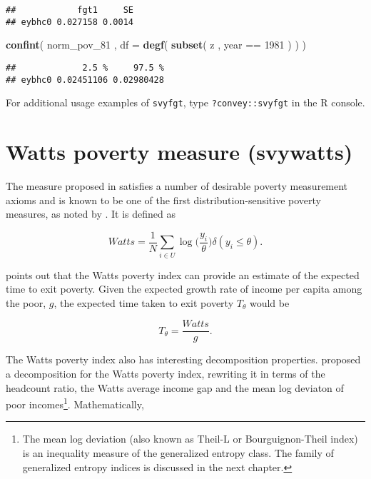 \documentclass[]{book}
\newenvironment{Shaded}{\begin{snugshade}}{\end{snugshade}}
\newcommand{\KeywordTok}[1]{\textcolor[rgb]{0.13,0.29,0.53}{\textbf{{#1}}}}
\newcommand{\DataTypeTok}[1]{\textcolor[rgb]{0.13,0.29,0.53}{{#1}}}
\newcommand{\DecValTok}[1]{\textcolor[rgb]{0.00,0.00,0.81}{{#1}}}
\newcommand{\StringTok}[1]{\textcolor[rgb]{0.31,0.60,0.02}{{#1}}}
\newcommand{\NormalTok}[1]{{#1}}
\let\rmarkdownfootnote\footnote%
\def\footnote{\protect\rmarkdownfootnote}
\begin{document}
\begin{verbatim}
##            fgt1     SE
## eybhc0 0.027158 0.0014
\end{verbatim}

\begin{Shaded}
\begin{Highlighting}[]
\KeywordTok{confint}\NormalTok{( norm_pov_81 , }\DataTypeTok{df =} \KeywordTok{degf}\NormalTok{( }\KeywordTok{subset}\NormalTok{( z , year ==}\StringTok{ }\DecValTok{1981} \NormalTok{) ) )}
\end{Highlighting}
\end{Shaded}

\begin{verbatim}
##             2.5 %     97.5 %
## eybhc0 0.02451106 0.02980428
\end{verbatim}

For additional usage examples of \texttt{svyfgt}, type
\texttt{?convey::svyfgt} in the R console.

\section{Watts poverty measure
(svywatts)}\label{watts-poverty-measure-svywatts}

The measure proposed in \citet{watts1968} satisfies a number of
desirable poverty measurement axioms and is known to be one of the first
distribution-sensitive poverty measures, as noted by
\citet{haughton2009}. It is defined as

\[
Watts = \frac{1}{N} \sum_{i \in U} \log{ \bigg( \frac{y_i}{\theta} \bigg) \delta ( y_i \leqslant \theta) }.
\]

\citet{murdoch1998} points out that the Watts poverty index can provide
an estimate of the expected time to exit poverty. Given the expected
growth rate of income per capita among the poor, \(g\), the expected
time taken to exit poverty \(T_\theta\) would be

\[
T_\theta = \frac{Watts}{g}.
\]

The Watts poverty index also has interesting decomposition properties.
\citet{chakravarty2008} proposed a decomposition for the Watts poverty
index, rewriting it in terms of the headcount ratio, the Watts average
income gap and the mean log deviaton of poor incomes\footnote{The mean
  log deviation (also known as Theil-L or Bourguignon-Theil index) is an
  inequality measure of the generalized entropy class. The family of
  generalized entropy indices is discussed in the next chapter.}.
Mathematically,
\end{document}

